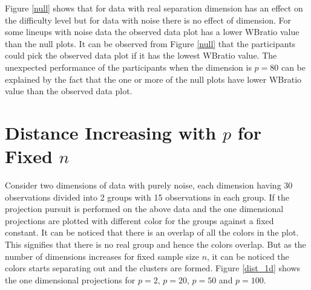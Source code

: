 \documentclass[12]{article}
\begin{document}
Figure \ref{null} shows that for data with real separation dimension has an effect on the difficulty level but for data with noise there is no effect of dimension. For some lineups with noise data the observed data plot has a lower WBratio value than the null plots. It can be observed from Figure \ref{null} that the participants could pick the observed data plot if it has the lowest WBratio value. The unexpected performance of the participants when the dimension  is $p = 80$ can be explained by the fact that the one or more of the null plots have lower WBratio value than the observed data plot.


\section{Distance Increasing with $p$ for Fixed $n$} \label{sec:distance}

Consider two dimensions of data with purely noise, each dimension having 30 observations divided into 2 groups with 15 observations in each group. If the projection pursuit is performed on the above data and the one dimensional projections are plotted with different color for the groups against a fixed constant. It can be noticed that there is an overlap of all the colors in the plot. This signifies that there is no real group and hence the colors overlap. But as the number of dimensions increases for fixed sample size $n$, it can be noticed the colors starts separating out and the clusters are formed. Figure \ref{dist_1d} shows the one dimensional projections for $p=2$, $p=20$, $p=50$ and $p=100$. \\
\end{document}
